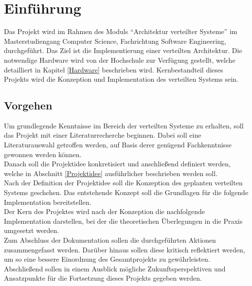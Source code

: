 \chapter{Einführung}
Das Projekt wird im Rahmen des Moduls \enquote{Architektur verteilter Systeme} im Masterstudiengang Computer Science, Fachrichtung Software Engineering, durchgeführt.  Das Ziel ist die Implementierung einer verteilten Architektur. Die notwendige Hardware wird von der Hochschule zur Verfügung gestellt, welche detailliert in Kapitel \ref{Hardware} beschrieben wird.
Kernbestandteil dieses Projekts wird die Konzeption und Implementation des verteilten Systems sein. 

 \section{Vorgehen}
Um grundlegende Kenntnisse im Bereich der verteilten Systeme zu erhalten, soll das Projekt mit einer Literaturrecherche beginnen. Dabei soll eine Literaturauswahl getroffen werden, auf Basis derer genügend Fachkenntnisse gewonnen werden können. \\
Danach soll die Projektidee konkretisiert und anschließend definiert werden, welche in Abschnitt \ref{Projektidee} ausführlicher beschrieben werden soll.\\
Nach der Definition der Projektidee soll die Konzeption des geplanten verteilten Systems geschehen. Das entstehende Konzept soll die Grundlagen für die folgende Implementation bereitstellen. \\
Der Kern des Projektes wird nach der Konzeption die nachfolgende Implementation darstellen, bei der die theoretischen Überlegungen in die Praxis umgesetzt werden. \\
Zum Abschluss der Dokumentation sollen die durchgeführten Aktionen zusammengefasst werden. Darüber hinaus sollen diese kritisch reflektiert werden, um so eine bessere Einordnung des Gesamtprojekts zu gewährleisten. Abschließend sollen in einem Ausblick mögliche Zukunftsperspektiven und Ansatzpunkte für die Fortsetzung dieses Projekts gegeben werden. 

